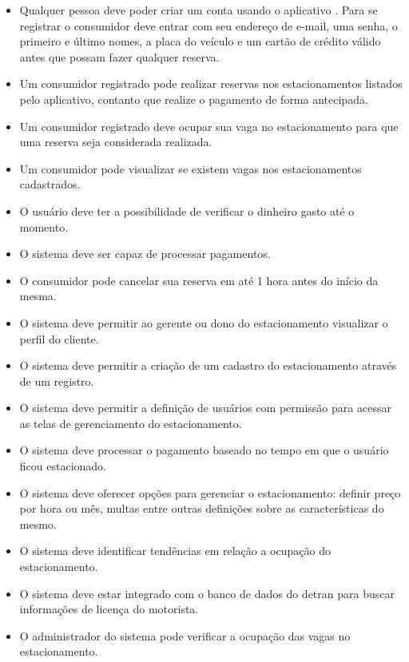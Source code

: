 \begin{itemize}
	\item Qualquer pessoa deve poder criar um conta usando o aplicativo \projectName{}. Para se registrar o consumidor deve entrar com seu endereço de e-mail, uma senha, o primeiro e último nomes, a placa do veículo e um cartão de crédito válido antes que possam fazer qualquer reserva.
	\item Um consumidor registrado pode realizar reservas nos estacionamentos listados pelo aplicativo, contanto que realize o pagamento de forma antecipada.
	\item Um consumidor registrado deve ocupar sua vaga no estacionamento para que uma reserva seja considerada realizada.
	\item Um consumidor pode visualizar se existem vagas nos estacionamentos cadastrados.
	\item O usuário deve ter a possibilidade de verificar o dinheiro gasto até o momento.
	\item O sistema deve ser capaz de processar pagamentos.
	\item O consumidor pode cancelar sua reserva em até 1 hora antes do início da mesma.
	\item O sistema deve permitir ao gerente ou dono do estacionamento visualizar o perfil do cliente.
	\item O sistema deve permitir a criação de um cadastro do estacionamento através de um registro.
	\item O sistema deve permitir a definição de usuários com permissão para acessar as telas de gerenciamento do estacionamento.
	\item O sistema deve processar o pagamento baseado no tempo em que o usuário ficou estacionado.
	\item O sistema deve oferecer opções para gerenciar o estacionamento: definir preço por hora ou mês, multas entre outras definições sobre as características do mesmo.
	\item O sistema deve identificar tendências em relação a ocupação do estacionamento.
	\item O sistema deve estar integrado com o banco de dados do detran para buscar informações de licença do motorista.
	\item O administrador do sistema pode verificar a ocupação das vagas no estacionamento.
\end{itemize}

